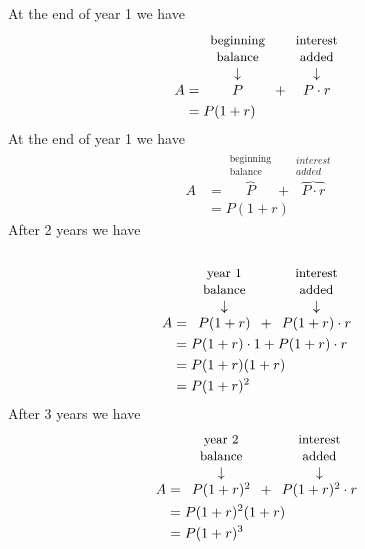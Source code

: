 At the end of year 1 we have
\begin{align*}
	A & = \begin{array}[b]{c} 
	$\small beginning$ \\
	$\small balance$\\
	\downarrow\\
	P
	\end{array}
	+  
	\begin{array}[b]{c}
	$\small interest$ \\
	$\small added$\\
	\downarrow \\
	P\cdot r \\
	\end{array}\\
	  & = P(1+r)              
\end{align*}
At the end of year 1 we have
\begin{align*}
	A & = \overbrace{P}^{\substack{\text{beginning} \\\text{balance}}} +  
	\overbrace{P\cdot r}^{\substack{interest\\added}}\\
	  & = P(1+r)                                    
\end{align*}
After 2 years we have
\begin{align*}
	A & = \begin{array}[b]{c}          \\
	$\small year 1$ \\
	$\small balance$\\
	\downarrow\\
	P(1+r)
	\end{array}
	+  
	\begin{array}[b]{c}
	$\small interest$ \\
	$\small added$\\
	\downarrow \\
	P(1+r)\cdot r 
	\end{array}\\
	  & = P(1+r)\cdot 1 +P(1+r)\cdot r \\
	  & = P(1+r)(1+r)                  \\    
	  & = P(1+r)^2                     
\end{align*}
After 3 years we have
\begin{align*}
	A & = \begin{array}[b]{c} 
	$\small year 2$ \\
	$\small balance$\\
	\downarrow\\
	P(1+r)^2
	\end{array}
	+  
	\begin{array}[b]{c}
	$\small interest$ \\
	$\small added$\\
	\downarrow \\
	P(1+r)^2\cdot r 
	\end{array}\\
	  & = P(1+r)^2(1+r)       \\    
	  & = P(1+r)^3            
\end{align*}
